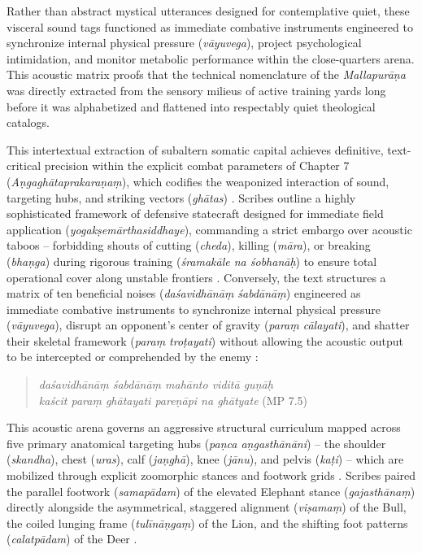 \documentclass[11pt,twoside,letterpaper]{article}
\begin{document}
Rather than abstract mystical utterances designed for contemplative quiet, these visceral sound tags functioned as immediate combative instruments engineered to synchronize internal physical pressure (\textit{vāyuvega}), project psychological intimidation, and monitor metabolic performance within the close-quarters arena. This acoustic matrix proofs that the technical nomenclature of the \textit{Mallapurāṇa} was directly extracted from the sensory milieus of active training yards long before it was alphabetized and flattened into respectably quiet theological catalogs.

This intertextual extraction of subaltern somatic capital achieves definitive, text-critical precision within the explicit combat parameters of Chapter 7 (\textit{Aṇgaghātaprakaraṇaṃ}), which codifies the weaponized interaction of sound, targeting hubs, and striking vectors (\textit{ghātas}) \citep{MP_7}. Scribes outline a highly sophisticated framework of defensive statecraft designed for immediate field application (\textit{yogakṣemārthasiddhaye}), commanding a strict embargo over acoustic taboos -- forbidding shouts of cutting (\textit{cheda}), killing (\textit{māra}), or breaking (\textit{bhaṇga}) during rigorous training (\textit{śramakāle na śobhanāḥ}) to ensure total operational cover along unstable frontiers \citep{MP_7}. Conversely, the text structures a matrix of ten beneficial noises (\textit{daśavidhānāṃ śabdānāṃ}) engineered as immediate combative instruments to synchronize internal physical pressure (\textit{vāyuvega}), disrupt an opponent's center of gravity (\textit{paraṃ cālayati}), and shatter their skeletal framework (\textit{paraṃ troṭayati}) without allowing the acoustic output to be intercepted or comprehended by the enemy \citep{MP_7}:

\begin{quote}
\textit{daśavidhānāṃ śabdānāṃ mahānto viditā guṇāḥ \\
kaścit paraṃ ghātayati pareṇāpi na ghātyate} (MP 7.5)
\end{quote}

This acoustic arena governs an aggressive structural curriculum mapped across five primary anatomical targeting hubs (\textit{paṇca aṇgasthānāni}) -- the shoulder (\textit{skandha}), chest (\textit{uras}), calf (\textit{jaṇghā}), knee (\textit{jānu}), and pelvis (\textit{kaṭi}) -- which are mobilized through explicit zoomorphic stances and footwork grids \citep{MP_7}. Scribes paired the parallel footwork (\textit{samapādam}) of the elevated Elephant stance (\textit{gajasthānaṃ}) directly alongside the asymmetrical, staggered alignment (\textit{viṣamaṃ}) of the Bull, the coiled lunging frame (\textit{tulīnāṇgaṃ}) of the Lion, and the shifting foot patterns (\textit{calatpādam}) of the Deer \citep{MP_7}. 
\end{document}
